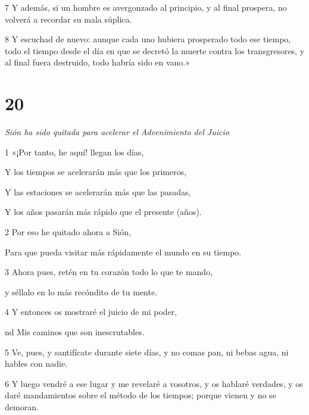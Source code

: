 \par 7 Y además, si un hombre es avergonzado al principio, y al final prospera, no volverá a recordar su mala súplica.

\par 8 Y escuchad de nuevo: aunque cada uno hubiera prosperado todo ese tiempo, todo el tiempo desde el día en que se decretó la muerte contra los transgresores, y al final fuera destruido, todo habría sido en vano.»

\chapter{20}

\par \textit{Sión ha sido quitada para acelerar el Advenimiento del Juicio}

\par 1 «¡Por tanto, he aquí! llegan los días,

\par Y los tiempos se acelerarán más que los primeros,

\par Y las estaciones se acelerarán más que las pasadas,

\par Y los años pasarán más rápido que el presente (años).

\par 2 Por eso he quitado ahora a Sión,

\par Para que pueda visitar más rápidamente el mundo en su tiempo.

\par 3 Ahora pues, retén en tu corazón todo lo que te mando,

\par y séllalo en lo más recóndito de tu mente.

\par 4 Y entonces os mostraré el juicio de mi poder,

\par nd Mis caminos que son inescrutables.

\par 5 Ve, pues, y santifícate durante siete días, y no comas pan, ni bebas agua, ni hables con nadie.

\par 6 Y luego vendré a ese lugar y me revelaré a vosotros, y os hablaré verdades, y os daré mandamientos sobre el método de los tiempos; porque vienen y no se demoran.

